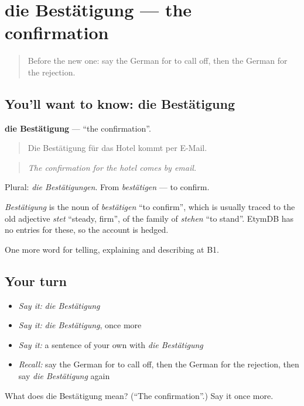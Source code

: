 \section[die Bestätigung]{die Bestätigung — the confirmation}

\label{lesson:GE-C371-bestaetigung}



\begin{quote}
Before the new one: say the German for to call off, then the German for the rejection.
\end{quote}

\subsection*{You'll want to know: die Bestätigung}
\textbf{die Bestätigung} — \textquotedblleft{}the confirmation\textquotedblright{}.

\begin{quote}
Die Bestätigung für das Hotel kommt per E-Mail.
\end{quote}

\begin{quote}
\emph{The confirmation for the hotel comes by email.}
\end{quote}

Plural: \emph{die Bestätigungen}. From \emph{bestätigen} — to confirm.

\begin{cousinweb}
\emph{Bestätigung} is the noun of \emph{bestätigen} \textquotedblleft{}to confirm\textquotedblright{}, which is usually traced to the old adjective \emph{stet} \textquotedblleft{}steady, firm\textquotedblright{}, of the family of \emph{stehen} \textquotedblleft{}to stand\textquotedblright{}. EtymDB has no entries for these, so the account is hedged.
\end{cousinweb}

\begin{grammarlens}[title={What you've built}]
One more word for telling, explaining and describing at B1.
\end{grammarlens}

\subsection*{Your turn}
\begin{itemize}
\raggedright
  \item \emph{Say it:} \emph{die Bestätigung}
  \item \emph{Say it:} \emph{die Bestätigung}, once more
  \item \emph{Say it:} a sentence of your own with \emph{die Bestätigung}
  \item \emph{Recall:} say the German for to call off, then the German for the rejection, then say \emph{die Bestätigung} again
\end{itemize}

\begin{tcolorbox}[breakable,colback=teal!4,colframe=teal!35!black,title={Before you move on}]
What does die Bestätigung mean? (\textquotedblleft{}The confirmation\textquotedblright{}.) Say it once more.
\end{tcolorbox}
